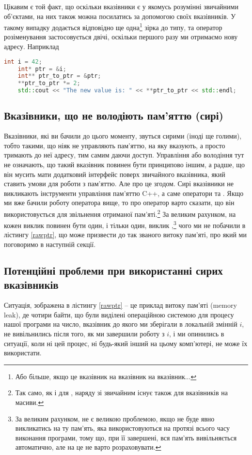 \documentclass[12pt]{article}
\begin{document}
    Цікавим є той факт, що оскільки вказівники є у якомусь розумінні звичайними об'єктами, на них також можна посилатись за допомогою своїх вказівників. У такому випадку додається відповідно ще одна\footnote{Або більше, якщо це вказівник на вказівник на вказівник...} зірка до типу, та оператор розіменування застосовується двічі, оскільки першого разу ми отримаємо нову адресу. Наприклад
    \begin{lstlisting}[language=c++]
    int i = 42;
    int* ptr = &i;
    int** ptr_to_ptr = &ptr;
    **ptr_to_ptr *= 2;
    std::cout << "The new value is: " << **ptr_to_ptr << std::endl;
    \end{lstlisting}

    \subsection{Вказівники, що не володіють пам'яттю (сирі)}
    Вказівники, які ви бачили до цього моменту, звуться сирими (іноді ще голими), тобто такими, що ніяк не управляють пам'яттю, на яку вказують, а просто тримають до неї адресу, тим самим даючи доступ. Управління або володіння тут не означають, що такий вказівник повинен бути принципово іншим, а радше, що він мусить мати додатковий інтерфейс поверх звичайного вказівника, який ставить умови для роботи з пам'яттю. Але про це згодом. Сирі вказівники не викликають інструменти управління пам'яттю C++, а саме оператори  та . Якщо ми вже бачили роботу оператора  вище, то про оператор  варто сказати, що він використовується для звільнення отриманої пам'яті.\footnote{Так само, як і для , наряду зі звичайним  існує також  для вказівників на масиви.} За великим рахунком, на кожен виклик  повинен бути один, і тільки один, виклик ,\footnote{За великим рахунком, не є великою проблемою, якщо  не буде явно викликатись на ту пам'ять, яка використовуються на протязі всього часу виконання програми, тому що, при її завершені, вся пам'ять вивільняється автоматично, але на це не варто розраховувати.} чого ми не побачили в лістингу \ref{rawptr}, що може призвести до так званого витоку пам'яті, про який ми поговоримо в наступній секції.

    \subsection{Потенційні проблеми при використанні сирих вказівників}
    Ситуація, зображена в лістингу \ref{rawptr} -- це приклад витоку пам'яті (memory leak), де чотири байти, що були виділені операційною системою для процесу нашої програми на число, вказівник до якого ми зберігали в локальній змінній $i$, не вивільнились після того, як ми завершили роботу з $i$, і ми опинились в ситуації, коли ні цей процес, ні будь-який інший на цьому комп'ютері, не може їх використати.
\end{document}
